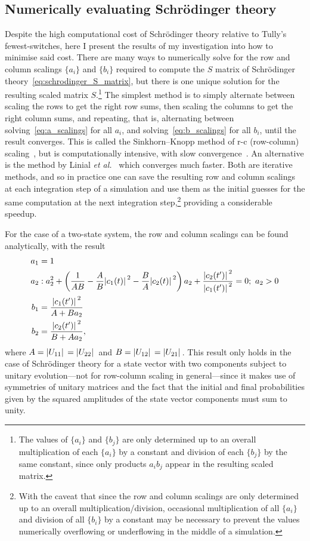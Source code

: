 \subsection{Numerically evaluating Schr\"odinger theory}\label{sec:schrodinger_theory_numerics}

Despite the high computational cost of Schr\"odinger theory relative to Tully's fewest-switches, here I present the results of my investigation into how to minimise said cost. There are many ways to numerically solve for the row and column scalings $\{a_i\}$ and $\{b_i\}$ required to compute the $S$ matrix of Schr\"odinger theory~\eqref{eq:schrodinger_S_matrix}, but there is one unique solution for the resulting scaled matrix $S$.\footnote{The values of $\{a_i\}$ and $\{b_j\}$ are only determined up to an overall multiplication of each $\{a_i\}$ by a constant and division of each $\{b_j\}$ by the same constant, since only products $a_i b_j$ appear in the resulting scaled matrix.} The simplest method is to simply alternate between scaling the rows to get the right row sums, then scaling the columns to get the right column sums, and repeating, that is, alternating between solving~\eqref{eq:a_scalings} for all $a_i$, and solving~\eqref{eq:b_scalings} for all $b_i$, until the result converges. This is called the Sinkhorn--Knopp method of r-c (row-column) scaling~\cite{knight_sinkhornknopp_2008}, but is computationally intensive, with slow convergence~\cite{Linial2000}. An alternative is the method by Linial \emph{et al.}~\cite{Linial2000} which converges much faster. Both are iterative methods, and so in practice one can save the resulting row and column scalings at each integration step of a simulation and use them as the initial guesses for the same computation at the next integration step,\footnote{With the caveat that since the row and column scalings are only determined up to an overall multiplication/division, occasional multiplication of all $\{a_i\}$ and division of all $\{b_i\}$ by a constant may be necessary to prevent the values numerically overflowing or underflowing in the middle of a simulation.} providing a considerable speedup.

For the case of a two-state system, the row and column scalings can be found analytically, with the result
\begin{align}
a_1 &= 1\\
a_2 &: a_2^2 + 
\left(\frac1{AB} - \frac AB \abs{c_1(t)}^2 - \frac BA \abs{c_2(t)}^2\right)a_2
+ \frac{\abs{c_2(t^\prime)}^2}{\abs{c_1(t^\prime)}^2} = 0;\ a_2 > 0\\
b_1 &= \frac{\abs{c_1(t^\prime)}^2}{A + B a_2}\\
b_2 &= \frac{\abs{c_2(t^\prime)}^2}{B + A a_2},
\end{align}
where $A = \abs{U_{11}} = \abs{U_{22}}$ and $B = \abs{U_{12}} = \abs{U_{21}}$. This result only holds in the case of Schr\"odinger theory for a state vector with two components subject to unitary evolution---not for row-column scaling in general---since it makes use of symmetries of unitary matrices and the fact that the initial and final probabilities given by the squared amplitudes of the state vector components must sum to unity.

